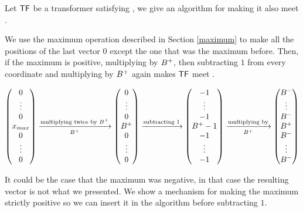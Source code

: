 Let $\mathsf{TF}$ be a transformer satisfying \projection, we give an algorithm for making it also meet \concentrated.

We use the maximum operation described in Section \ref{maximum} to make all the positions of the last vector $0$ except the one that was the maximum before.
Then, if the maximum is positive, multiplying by $B^{+}$, then subtracting $1$ from every coordinate and multiplying by $B^{+}$ again makes $\mathsf{TF}$ meet \concentrated.

\[
    \left( \begin{matrix} 0 \\ \vdots \\ 0 \\ x_{max} \\ 0 \\ \vdots \\ 0    \end{matrix} \right) 
    \xrightarrow[B^{+}]{\text{multiplying twice by }B^{+}}
    \left( \begin{matrix} 0 \\ \vdots \\ 0 \\ B^{+} \\ 0 \\ \vdots \\ 0    \end{matrix} \right) 
    \xrightarrow{\text{subtracting } 1}
    \left( \begin{matrix} -1 \\ \vdots \\ -1 \\ B^{+} -1 \\ -1 \\ \vdots \\ -1    \end{matrix} \right) 
    \xrightarrow[B^{+}]{\text{multiplying by}}
    \left( \begin{matrix} B^{-} \\ \vdots \\ B^{-} \\ B^{+} \\ B^{-} \\ \vdots \\ B^{-}    \end{matrix} \right) 
\]

It could be the case that the maximum was negative, in that case the resulting vector is not what we presented.
We show a mechanism for making the maximum strictly positive so we can insert it in the algorithm before subtracting $1$.

